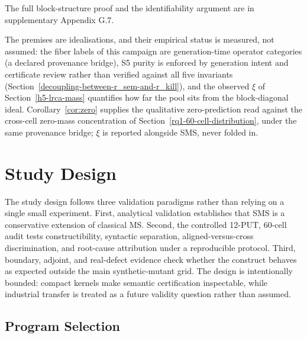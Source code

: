 \documentclass[manuscript,screen,review]{acmart}
\begin{document}
The full block-structure proof and the identifiability argument are in
supplementary Appendix G.7.

The premises are idealisations, and their empirical status is measured,
not assumed: the fiber labels of this campaign are generation-time
operator categories (a declared provenance bridge), S5 purity is
enforced by generation intent and certificate review rather than
verified against all five invariants
(Section~\ref{decoupling-between-r_sem-and-r_kill}), and the observed
$\xi$ of Section~\ref{h5-lrca-mass} quantifies how far the pool sits
from the block-diagonal ideal. Corollary~\ref{cor:zero} supplies the
qualitative zero-prediction read against the cross-cell zero-mass
concentration of Section~\ref{rq1-60-cell-distribution}, under the same
provenance bridge; $\xi$ is reported alongside SMS, never folded in.


\section{Study Design}\label{experimental-subjects-and-operator-framework}

The study design follows three validation paradigms rather than relying
on a single small experiment. First, analytical validation establishes
that SMS is a conservative extension of classical MS. Second, the
controlled 12-PUT, 60-cell audit tests constructibility, syntactic
separation, aligned-versus-cross discrimination, and root-cause
attribution under a reproducible protocol. Third, boundary, adjoint, and
real-defect evidence check whether the construct behaves as expected
outside the main synthetic-mutant grid. The design is intentionally
bounded: compact kernels make semantic certification inspectable, while
industrial transfer is treated as a future validity question rather than
assumed.

\subsection{Program Selection}\label{put-selection-12-puts-4-classes}
\end{document}
